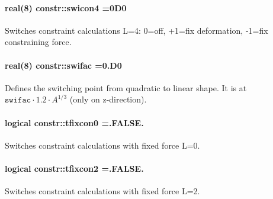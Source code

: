 \paragraph[{\texorpdfstring{swicon4}{swicon4}}]{\setlength{\rightskip}{0pt plus 5cm}real(8) constr\+::swicon4 =0\+D0}\hypertarget{namespaceconstr_aa5697aee92cd101480fe1d582d420289}{}\label{namespaceconstr_aa5697aee92cd101480fe1d582d420289}


Switches constraint calculations L=4\+: 0=off, +1=fix deformation, -\/1=fix constraining force. 

\paragraph[{\texorpdfstring{swifac}{swifac}}]{\setlength{\rightskip}{0pt plus 5cm}real(8) constr\+::swifac =0.\+D0}\hypertarget{namespaceconstr_a3fd79277600455ba53c2bba7052f8d14}{}\label{namespaceconstr_a3fd79277600455ba53c2bba7052f8d14}


Defines the switching point from quadratic to linear shape. It is at $ \texttt{swifac} \cdot 1.2 \cdot A^{1/3}$ (only on z-\/direction). 

\paragraph[{\texorpdfstring{tfixcon0}{tfixcon0}}]{\setlength{\rightskip}{0pt plus 5cm}logical constr\+::tfixcon0 =.F\+A\+L\+S\+E.}\hypertarget{namespaceconstr_a76159265fc288587aafd56361bfe9706}{}\label{namespaceconstr_a76159265fc288587aafd56361bfe9706}


Switches constraint calculations with fixed force L=0. 

\paragraph[{\texorpdfstring{tfixcon2}{tfixcon2}}]{\setlength{\rightskip}{0pt plus 5cm}logical constr\+::tfixcon2 =.F\+A\+L\+S\+E.}\hypertarget{namespaceconstr_a66742ff27c6afbcbc425dfb72bca40dd}{}\label{namespaceconstr_a66742ff27c6afbcbc425dfb72bca40dd}


Switches constraint calculations with fixed force L=2. 

